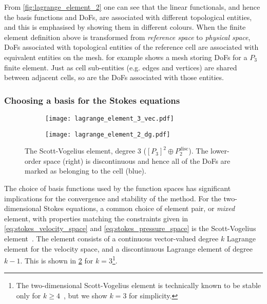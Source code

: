 \documentclass[thesis]{subfiles}
\begin{document}
From \cref{fig:lagrange_element_2} one can see that the linear functionals, and hence the basis functions and DoFs, are associated with different topological entities, and this is emphasised by showing them in different colours.
When the finite element definition above is transformed from \textit{reference space} to \textit{physical space}, DoFs associated with topological entities of the reference cell are associated with equivalent entities on the mesh.
 for example shows a mesh storing DoFs for a $P_3$ finite element.
Just as cell sub-entities (e.g. edges and vertices) are shared between adjacent cells, so are the DoFs associated with those entities.

\subsubsection{Choosing a basis for the Stokes equations}

\begin{figure}
  \centering
  \begin{subfigure}{.35\textwidth}
    \centering
    \texttt{[image: lagrange\_element\_3\_vec.pdf]}
    \label{fig:scott_vogelius_element_P3}
  \end{subfigure}
  \begin{subfigure}{.35\textwidth}
    \centering
    \texttt{[image: lagrange\_element\_2\_dg.pdf]}
  \end{subfigure}
  \caption{
    The Scott-Vogelius element, degree 3 ($[P_3]^2 \oplus P_2^\mathrm{disc}$).
    The lower-order space (right) is discontinuous and hence all of the DoFs are marked as belonging to the cell (blue).
  }
  \label{fig:scott_vogelius_element}
\end{figure}

The choice of basis functions used by the function spaces has significant implications for the convergence and stability of the method.
For the two-dimensional Stokes equations, a common choice of element pair, or \textit{mixed} element, with properties matching the constraints given in \cref{eq:stokes_velocity_space} and \cref{eq:stokes_pressure_space} is the Scott-Vogelius element~\cite{scottNormEstimatesMaximal1985}.
The element consists of a continuous vector-valued degree $k$ Lagrange element for the velocity space, and a discontinuous Lagrange element of degree $k-1$.
This is shown in \cref{fig:scott_vogelius_element} for $k = 3$\footnote{The two-dimensional Scott-Vogelius element is technically known to be stable only for $k \geq 4$~\cite{guzmanScottVogeliusFiniteElements2018}, but we show $k = 3$ for simplicity.}.
\end{document}
